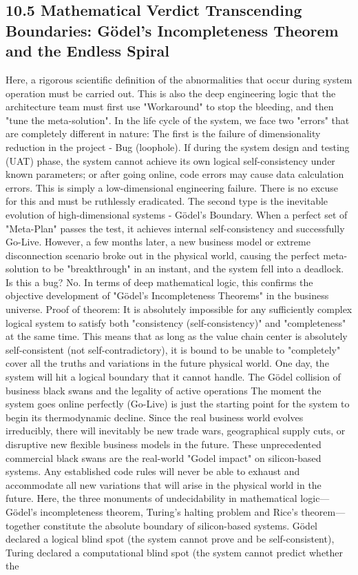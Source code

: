 \documentclass[11pt,a4paper]{article}
\begin{document}
\subsection*{10.5 Mathematical Verdict Transcending Boundaries: Gödel’s Incompleteness Theorem and the Endless Spiral}


Here, a rigorous scientific definition of the abnormalities that occur during system operation must be carried out. This is also the deep engineering logic that the architecture team must first use "Workaround" to stop the bleeding, and then "tune the meta-solution". In the life cycle of the system, we face two "errors" that are completely different in nature: The first is the failure of dimensionality reduction in the project - Bug (loophole). If during the system design and testing (UAT) phase, the system cannot achieve its own logical self-consistency under known parameters; or after going online, code errors may cause data calculation errors. This is simply a low-dimensional engineering failure. There is no excuse for this and must be ruthlessly eradicated. The second type is the inevitable evolution of high-dimensional systems - Gödel's Boundary. When a perfect set of "Meta-Plan" passes the test, it achieves internal self-consistency and successfully Go-Live. However, a few months later, a new business model or extreme disconnection scenario broke out in the physical world, causing the perfect meta-solution to be "breakthrough" in an instant, and the system fell into a deadlock. Is this a bug? No. In terms of deep mathematical logic, this confirms the objective development of "Gödel's Incompleteness Theorems" in the business universe. Proof of theorem: It is absolutely impossible for any sufficiently complex logical system to satisfy both "consistency (self-consistency)" and "completeness" at the same time. This means that as long as the value chain center is absolutely self-consistent (not self-contradictory), it is bound to be unable to "completely" cover all the truths and variations in the future physical world. One day, the system will hit a logical boundary that it cannot handle. The Gödel collision of business black swans and the legality of active operations The moment the system goes online perfectly (Go-Live) is just the starting point for the system to begin its thermodynamic decline. Since the real business world evolves irreducibly, there will inevitably be new trade wars, geographical supply cuts, or disruptive new flexible business models in the future. These unprecedented commercial black swans are the real-world "Godel impact" on silicon-based systems. Any established code rules will never be able to exhaust and accommodate all new variations that will arise in the physical world in the future. Here, the three monuments of undecidability in mathematical logic—Gödel’s incompleteness theorem, Turing’s halting problem and Rice’s theorem—together constitute the absolute boundary of silicon-based systems. Gödel declared a logical blind spot (the system cannot prove and be self-consistent), Turing declared a computational blind spot (the system cannot predict whether the 
\end{document}
